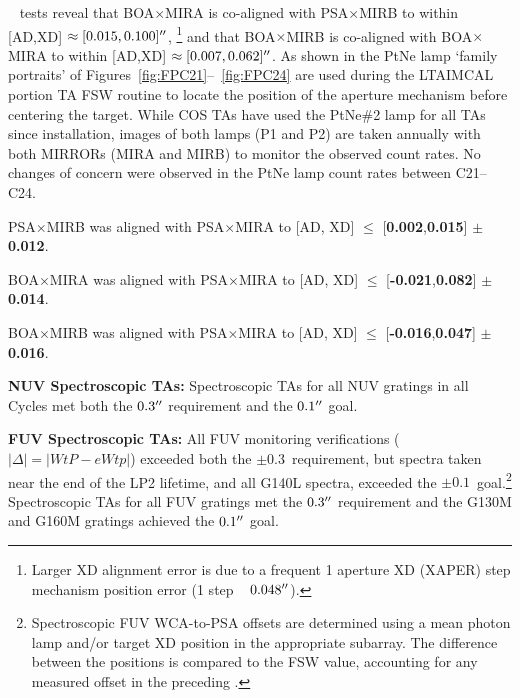 \begin{description}
	~ tests reveal that BOA$\times$MIRA is co-aligned with PSA$\times$MIRB to within [AD,XD] $\approx [0.015,0.100]\hbox{$^{\prime\prime}$}$,
	\footnote{Larger XD alignment error is due to a frequent 1 aperture XD (XAPER) step mechanism position error (1 step ~ $0.048\hbox{$^{\prime\prime}$}$).}
	and that BOA$\times$MIRB is co-aligned with BOA$\times$MIRA to within [AD,XD] $\approx [0.007,0.062]\hbox{$^{\prime\prime}$}$.
	As shown in the PtNe lamp `family portraits' of Figures~\ref{fig:FPC21}--~\ref{fig:FPC24} are used during the \textsc{LTAIMCAL} portion  TA FSW routine to locate the position of the aperture mechanism before centering the target.
	While COS TAs have used the PtNe\#2 lamp for all TAs since installation, images of both lamps (P1 and P2) are taken annually with both MIRRORs
	(MIRA and MIRB) to monitor the observed count rates. No changes of concern were observed in the PtNe lamp count rates between C21--C24.
\item PSA$\times$MIRB was aligned with PSA$\times$MIRA to [AD, XD] $\le$ [{\bf 0.002},{\bf 0.015}] $\pm$ {\bf 0.012}\arcsec.
\item BOA$\times$MIRA was aligned with PSA$\times$MIRA to [AD, XD] $\le$ [{\bf-0.021},{\bf 0.082}] $\pm$ {\bf 0.014}\arcsec.
\item BOA$\times$MIRB was aligned with PSA$\times$MIRA to [AD, XD] $\le$ [{\bf-0.016},{\bf 0.047}] $\pm$ {\bf 0.016}\arcsec.
\item{\bf NUV Spectroscopic TAs:}
	Spectroscopic TAs for all NUV gratings in all Cycles met both the $0.3\hbox{$^{\prime\prime}$}$ requirement and the $0.1\hbox{$^{\prime\prime}$}$ goal.
\item{\bf FUV Spectroscopic TAs:}
All FUV monitoring verifications ($|\Delta| = |WtP-eWtp|$) exceeded both the $\pm0.3$\arcsec\ requirement,
but spectra taken near the end of the LP2 lifetime, and all G140L spectra, exceeded the $\pm0.1$\arcsec\ goal.\footnote{Spectroscopic FUV WCA-to-PSA offsets are determined using a mean photon lamp and/or target XD position in the appropriate subarray.
	The difference between the positions is compared to the FSW value, accounting for any measured offset in the preceding .}
	Spectroscopic TAs for all FUV gratings met the $0.3\hbox{$^{\prime\prime}$}$ requirement and the G130M and G160M gratings achieved the $0.1\hbox{$^{\prime\prime}$}$ goal.
\end{description}
